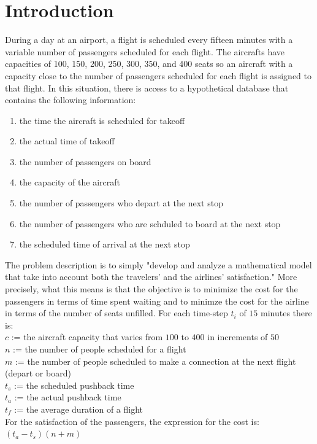 \documentclass[12pt]{article}
\begin{document}
\section{Introduction}
During a day at an airport, a flight is scheduled every fifteen minutes with a variable number of passengers scheduled for each flight. The aircrafts have capacities of 100, 150, 200, 250, 300, 350, and 400 seats so an aircraft with a capacity close to the number of passengers scheduled for each flight is assigned to that flight. In this situation, there is access to a hypothetical database that contains the following information:
\begin{enumerate}
    \item the time the aircraft is scheduled for takeoff
    \item the actual time of takeoff
    \item the number of passengers on board
    \item the capacity of the aircraft
    \item the number of passengers who depart at the next stop
    \item the number of passengers who are schduled to board at the next stop
    \item the scheduled time of arrival at the next stop
\end{enumerate}
The problem description is to simply "develop and analyze a mathematical model that take into account both the travelers' and the airlines' satisfaction." More precisely, what this means is that the objective is to minimize the cost for the passengers in terms of time spent waiting and to minimze the cost for the airline in terms of the number of seats unfilled. For each time-step $t_{i}$ of $15$ minutes there is: \\
$c$ := the aircraft capacity that varies from $100$ to $400$ in increments of $50$ \\
$n$ := the number of people scheduled for a flight \\
$m$ := the number of people scheduled to make a connection at the next flight (depart or board) \\
$t_{s}$ := the scheduled pushback time \\
$t_{a}$ := the actual pushback time \\
$t_{f}$ := the average duration of a flight
\\
For the satisfaction of the passengers, the expression for the cost is: \\
$(t_{a} - t_{s})(n + m)$ \\
\end{document}
